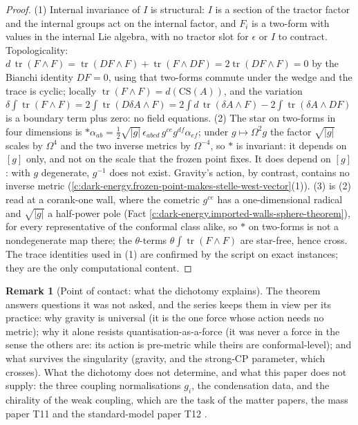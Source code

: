 \documentclass[11pt]{article}
\theoremstyle{definition}
\newtheorem{remark}[theorem]{Remark}
\theoremstyle{plain}
\providecommand{\tr}{}\renewcommand{\tr}{\operatorname{tr}}
\begin{document}
\begin{proof}
(1) Internal invariance of $I$ is structural: $I$ is a section of the tractor factor and the internal groups act on the internal factor, and $F_i$ is a two-form with values in the internal Lie algebra, with no tractor slot for $\epsilon$ or $I$ to contract. Topologicality: $d\,\tr(F\wedge F) = \tr(DF\wedge F) + \tr(F\wedge DF) = 2\tr(DF\wedge F) = 0$ by the Bianchi identity $DF = 0$, using that two-forms commute under the wedge and the trace is cyclic; locally $\tr(F\wedge F) = d(\mathrm{CS}(A))$, and the variation $\delta\int\tr(F\wedge F) = 2\int\tr(D\delta A\wedge F) = 2\int d\,\tr(\delta A\wedge F) - 2\int\tr(\delta A\wedge DF)$ is a boundary term plus zero: no field equations. (2) The star on two-forms in four dimensions is $*\alpha_{ab} = \tfrac12\sqrt{|g|}\,\epsilon_{abcd}\,g^{ce}g^{df}\alpha_{ef}$; under $g \mapsto \Omega^2 g$ the factor $\sqrt{|g|}$ scales by $\Omega^4$ and the two inverse metrics by $\Omega^{-4}$, so $*$ is invariant: it depends on $[g]$ only, and not on the scale that the frozen point fixes. It does depend on $[g]$: with $g$ degenerate, $g^{-1}$ does not exist. Gravity's action, by contrast, contains no inverse metric (\ref{c:dark-energy.frozen-point-makes-stelle-west-vector}(1)). (3) is (2) read at a corank-one wall, where the cometric $g^{ce}$ has a one-dimensional radical and $\sqrt{|g|}$ a half-power pole (Fact \ref{c:dark-energy.imported-walls-sphere-theorem}), for every representative of the conformal class alike, so $*$ on two-forms is not a nondegenerate map there; the $\theta$-terms $\theta\int\tr(F\wedge F)$ are star-free, hence cross. The trace identities used in (1) are confirmed by the script on exact instances; they are the only computational content.

\end{proof}

\begin{remark}[Point of contact: what the dichotomy explains]\label{c:note.dark-energy.point-contact-what-dichotomy-explains}
The theorem answers questions it was not asked, and the series keeps them in view per its practice: why gravity is universal (it is the one force whose action needs no metric); why it alone resists quantisation-as-a-force (it was never a force in the sense the others are: its action is pre-metric while theirs are conformal-level); and what survives the singularity (gravity, and the strong-CP parameter, which crosses). What the dichotomy does not determine, and what this paper does not supply: the three coupling normalisations $g_i$, the condensation data, and the chirality of the weak coupling, which are the task of the matter papers, the mass paper T11 \cite{ButlerT11} and the standard-model paper T12 \cite{ButlerT12}.
\end{remark}
\end{document}
